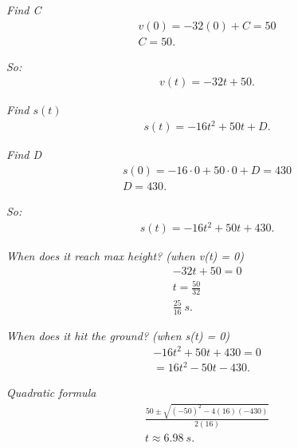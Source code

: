 \documentclass{report}
\begin{document}
  \bigbreak \noindent 
  \textit{Find C}
  \begin{align*}
    v(0) = -32(0) + C = 50 \\
    C = 50
  .\end{align*}

  \bigbreak \noindent 
  \textit{So:}
  \begin{align*}
    v(t) = -32t + 50
  .\end{align*}

  \bigbreak \noindent 
  \textit{Find $s(t)$}
  \begin{align*}
    s(t) = -16t^{2} +50t + D
  .\end{align*}

  \bigbreak \noindent 
  \textit{Find D}
  \begin{align*}
    s(0) = -16 \cdot 0+ 50\cdot 0 + D =430 \\
    D =430
  .\end{align*}

  \bigbreak \noindent 
  \textit{So:}
  \begin{align*}
    s(t) = -16t^{2} + 50t + 430
  .\end{align*}

  \pagebreak \bigbreak \noindent
  \textit{When does it reach max height? (when v(t) = 0)}
  \begin{align*}
    -32t + 50 = 0 \\
    t = \frac{50}{32} \\
    \frac{25}{16}\ s
  .\end{align*}

  \bigbreak \noindent 
  \textit{When does it hit the ground? (when s(t) = 0)}
  \begin{align*}
    -16t^{2} + 50t +430 = 0 \\
    = 16t^{2} -50t - 430
  .\end{align*}

  \bigbreak \noindent 
  \textit{Quadratic formula}
  \begin{align*}
    \frac{50\pm \sqrt{(-50)^{2}-4(16)(-430)}}{2(16)} \\
    t \approx 6.98\ s
  .\end{align*}
\end{document}

